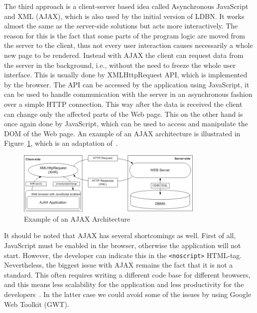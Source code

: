 The third approach is
a client-server based idea called Asynchronous JavaScript and XML (AJAX),
which is also used by the initial version of LDBN. 
It works almost the same as the server-side solutions but acts more interactively. The
reason for this is the fact that some parts of the program logic are moved from the server
to the client, thus not every user interaction causes necessarily a whole new page
to be rendered. Instead with AJAX the client can request 
data from the server in the background, i.e., without the need to freeze the whole user interface. 
This is usually done by XMLHttpRequest API, which is implemented
by the browser. The API can be accessed by the application using JavaScript, it can be
used to handle communication with the server in an asynchronous fashion over a
simple HTTP connection.
This way after the data is received the client can change only the affected parts of the Web page. 
This on the other hand is once again done by JavaScript, which 
can be used to access and manipulate the DOM of the Web page.
An example of an AJAX architecture is illustrated in Figure~\ref{fig:ajax01}, 
which is an adaptation of~\cite[Figure 3.1]{mt1}.

\begin{figure}[ht]
	\begin{center}
		\includegraphics[width=0.8\textwidth]{./img/ajax01a.png}
		\caption{Example of an AJAX Architecture}
		\label{fig:ajax01}
	\end{center}
\end{figure}


It should be noted that AJAX has several shortcomings as well. First of all, 
JavaScript must be enabled in the browser, otherwise the application will not start.
However, the developer can indicate this in the \verb=<noscript>= HTML-tag. 
Nevertheless, the biggest issue with AJAX remains the fact that it is not a
standard. This often requires writing a different code base for different
browsers, and this means less scalability for the application and less productivity for
the developers~\cite{bgwt2}. In the latter case we could avoid some of the issues by using 
Google Web Toolkit (GWT).

